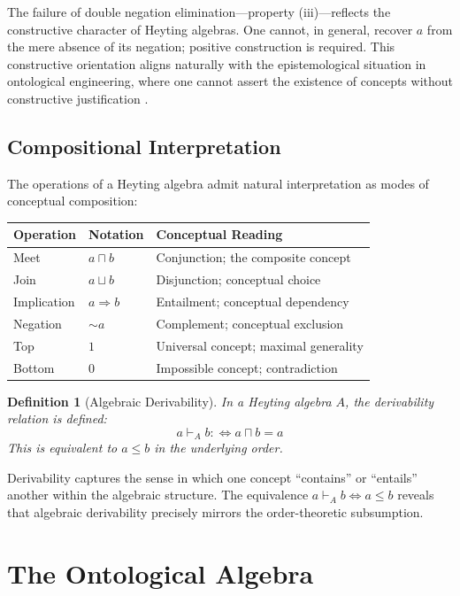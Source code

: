 \documentclass[11pt,a4paper]{article}
\newtheorem{definition}{Definition}[section]
\begin{document}
The failure of double negation elimination---property (iii)---reflects the constructive character of Heyting algebras. One cannot, in general, recover $a$ from the mere absence of its negation; positive construction is required. This constructive orientation aligns naturally with the epistemological situation in ontological engineering, where one cannot assert the existence of concepts without constructive justification \citep[cf.][]{sorensen2006}.

\subsection{Compositional Interpretation}

The operations of a Heyting algebra admit natural interpretation as modes of conceptual composition:

\begin{center}
\renewcommand{\arraystretch}{1.3}
\begin{tabular}{lll}
\textbf{Operation} & \textbf{Notation} & \textbf{Conceptual Reading}\\
\hline
Meet & $a \sqcap b$ & Conjunction; the composite concept\\
Join & $a \sqcup b$ & Disjunction; conceptual choice\\
Implication & $a \Rightarrow b$ & Entailment; conceptual dependency\\
Negation & $\sim a$ & Complement; conceptual exclusion\\
Top & $1$ & Universal concept; maximal generality\\
Bottom & $0$ & Impossible concept; contradiction
\end{tabular}
\end{center}

\begin{definition}[Algebraic Derivability]
In a Heyting algebra $A$, the \emph{derivability relation} is defined:
$$
a \vdash_A b :\iff a \sqcap b = a
$$
This is equivalent to $a \leq b$ in the underlying order.
\end{definition}

Derivability captures the sense in which one concept ``contains'' or ``entails'' another within the algebraic structure. The equivalence $a \vdash_A b \iff a \leq b$ reveals that algebraic derivability precisely mirrors the order-theoretic subsumption.

\section{The Ontological Algebra}
\end{document}
